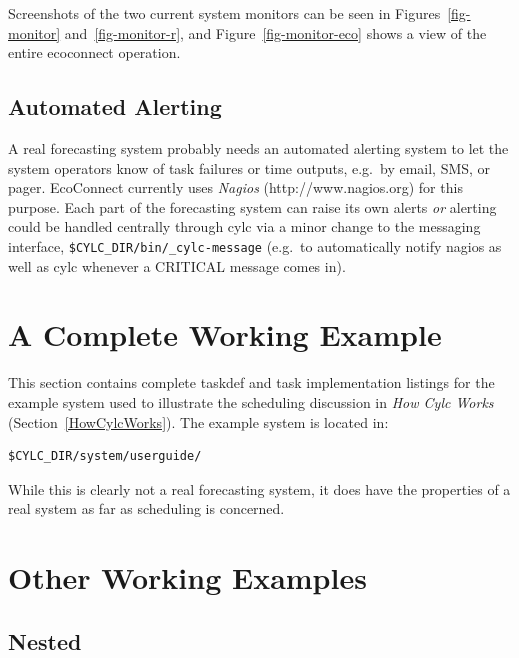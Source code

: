 \documentclass[11pt,a4paper]{article}
\begin{document}
Screenshots of the two current system monitors can be seen in
Figures~\ref{fig-monitor} and~\ref{fig-monitor-r}, and
Figure~\ref{fig-monitor-eco} shows a view of the entire ecoconnect operation.

\subsection{Automated Alerting}

A real forecasting system probably needs an automated alerting system  
to let the system operators know of task failures or time outputs, e.g.\ 
by email, SMS, or pager.  EcoConnect currently uses {\em Nagios}
(http://www.nagios.org) for this purpose.  Each part of the forecasting
system can raise its own alerts {\em or} alerting could be handled
centrally through cylc via a minor change to the messaging interface,
\lstinline=$CYLC_DIR/bin/_cylc-message= (e.g.\ to automatically notify 
nagios as well as cylc whenever a CRITICAL message comes in).


\pagebreak
\section{A Complete Working Example}
\label{ACompleteWorkingExample}

This section contains complete taskdef and task implementation listings
for the example system used to illustrate the scheduling discussion in
{\em How Cylc Works} (Section~\ref{HowCylcWorks}). The example system
is located in:

\begin{lstlisting}
$CYLC_DIR/system/userguide/
\end{lstlisting}

 While this is clearly not a real forecasting system, it does have the
 properties of a real system as far as scheduling is concerned.  




\pagebreak


\section{Other Working Examples}
\label{OtherWorkingExamples}

\subsection{Nested}
\end{document}
